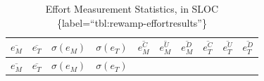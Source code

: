 \begin{longtable}[]{@{}llllllllll@{}}
\caption{Effort Measurement Statistics, in SLOC \{label=``tbl:rewamp-effortresults''\}}\tabularnewline
\toprule
\begin{minipage}[b]{0.07\columnwidth}\raggedright
\(\overline{e_M}\)\strut
\end{minipage} & \begin{minipage}[b]{0.07\columnwidth}\raggedright
\(\overline{e_T}\)\strut
\end{minipage} & \begin{minipage}[b]{0.06\columnwidth}\raggedright
\(\sigma(e_M)\)\strut
\end{minipage} & \begin{minipage}[b]{0.06\columnwidth}\raggedright
\(\sigma(e_T)\)\strut
\end{minipage} & \begin{minipage}[b]{0.08\columnwidth}\raggedright
\(\overline{e_M^C}\)\strut
\end{minipage} & \begin{minipage}[b]{0.08\columnwidth}\raggedright
\(\overline{e_M^U}\)\strut
\end{minipage} & \begin{minipage}[b]{0.08\columnwidth}\raggedright
\(\overline{e_M^D}\)\strut
\end{minipage} & \begin{minipage}[b]{0.08\columnwidth}\raggedright
\(\overline{e_T^C}\)\strut
\end{minipage} & \begin{minipage}[b]{0.08\columnwidth}\raggedright
\(\overline{e_T^U}\)\strut
\end{minipage} & \begin{minipage}[b]{0.08\columnwidth}\raggedright
\(\overline{e_T^D}\)\strut
\end{minipage}\tabularnewline
\midrule
\endfirsthead
\toprule
\begin{minipage}[b]{0.07\columnwidth}\raggedright
\(\overline{e_M}\)\strut
\end{minipage} & \begin{minipage}[b]{0.07\columnwidth}\raggedright
\(\overline{e_T}\)\strut
\end{minipage} & \begin{minipage}[b]{0.06\columnwidth}\raggedright
\(\sigma(e_M)\)\strut
\end{minipage} & \begin{minipage}[b]{0.06\columnwidth}\raggedright
\(\sigma(e_T)\)\strut
\end{minipage} & \begin{minipage}[b]{0.08\columnwidth}\raggedright

\end{minipage}
\end{longtable}
